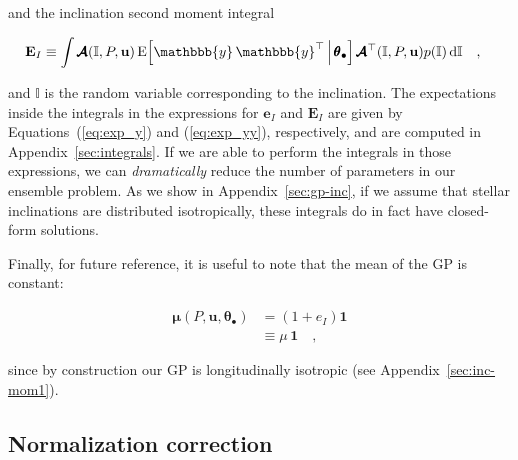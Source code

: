 \documentclass[modern,linenumbers]{aastex62}
\begin{document}
%
and the inclination second moment integral
%
\begin{linenomath}\begin{align}
        \label{eq:EI}
        \mathbf{E}_I
         & \equiv
        \int
        \pmb{\mathcal{A}}(\mathbb{I}, P, \mathbf{u}) \,
        \mathrm{E} \Big[ \mathbbb{y} \, \mathbbb{y}^\top \, \Big| \, \pmb{\theta}_\bullet \Big] \,
        \pmb{\mathcal{A}}^\top(\mathbb{I}, P, \mathbf{u})
        p(\mathbb{I}) \, \mathrm{d}\mathbb{I}
        \quad,
    \end{align}\end{linenomath}
%
and $\mathbb{I}$ is the random variable corresponding to the inclination.
%
The expectations inside the integrals in the expressions for
$\mathbf{e}_I$ and $\mathbf{E}_I$
are given by
Equations~(\ref{eq:exp_y}) and (\ref{eq:exp_yy}), respectively, and
are computed in Appendix~\ref{sec:integrals}.
%
If we are able to perform the integrals in those expressions,
we can \emph{dramatically} reduce the number of
parameters in our ensemble problem.
%
As we show in Appendix~\ref{sec:gp-inc}, if we assume that stellar
inclinations are distributed isotropically, these integrals
do in fact have closed-form solutions.

%
Finally, for future reference, it is useful to note that the mean of the GP
is constant:
%
\begin{linenomath}\begin{align}
        \label{eq:scalar-mean}
        \pmb{\mu}(P, \mathbf{u}, \pmb{\theta}_\bullet)
         & =  (1 + e_I)\mathbf{1}
        \nonumber                 \\
         & \equiv
        \mu \, \mathbf{1}
        \quad,
    \end{align}\end{linenomath}
%
since by construction our GP is longitudinally isotropic
(see Appendix~\ref{sec:inc-mom1}).

\subsection{Normalization correction}
\label{sec:gp-norm}
\end{document}
